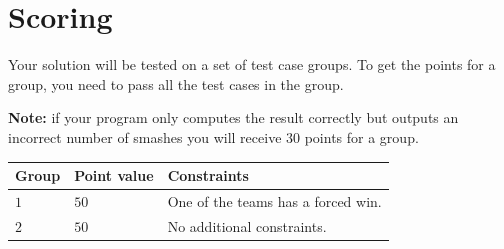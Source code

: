 \section*{Scoring}
Your solution will be tested on a set of test case groups.
To get the points for a group, you need to pass all the test cases in the group.

\textbf{Note:} if your program only computes the result correctly but outputs an incorrect number of smashes you will receive $30$ points for a group.

\noindent
\begin{tabular}{| l | l | p{12cm} |}
  \hline
  \textbf{Group} & \textbf{Point value} & \textbf{Constraints} \\ \hline
  $1$    & $50$        & One of the teams has a forced win.\\ \hline 
  $2$    & $50$        & No additional constraints. \\ \hline 
\end{tabular}
